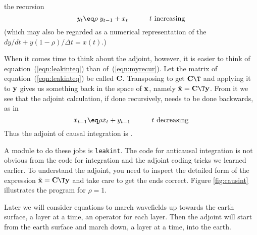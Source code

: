 the recursion
\begin{equation}
y_t \eq \rho\; y_{t-1} + x_t
\quad
\quad
\quad t\ {\rm increasing}
\label{eqn:myrecur}
\end{equation}
(which may also be regarded as a numerical representation
of the  $dy/dt+y (1-\rho)/\Delta t=x(t)$.)
\par
When it comes time to think about the adjoint, however,
it is easier to think of equation~(\ref{eqn:leakinteq}) than of~(\ref{eqn:myrecur}).
Let the matrix of equation~(\ref{eqn:leakinteq}) be called $\bold C$.
Transposing to get $\bold{C}\T$ and applying it to $\bold y$
gives us something back in the space of $\bold x$,
namely $\tilde{\bold x} = \bold C\T \bold y$.
From it we see that the adjoint calculation,
if done recursively,
needs to be done backwards, as in
\begin{equation}
\tilde x_{t-1} \eq \rho \tilde x_{t} + y_{t-1}
\quad
\quad
\quad t \ {\rm decreasing}
\label{eqn:backrecur}
\end{equation}
Thus the adjoint of causal integration
is .
\par
A module to do these jobs is \texttt{leakint}.
The code for anticausal integration is not obvious
from the code for integration and the adjoint coding tricks we
learned earlier.
To understand the adjoint, you need to inspect
the detailed form of the expression $\tilde{\bold x} = \bold C\T \bold y$
and take care to get the ends correct.
Figure \ref{fig:causint} illustrates the program for $\rho = 1$.
\par
{}
\par
Later we will consider equations
to march wavefields up towards the earth surface,
a layer at a time, an operator for each layer.
Then the adjoint will start from the earth surface
and march down, a layer at a time, into the earth.

